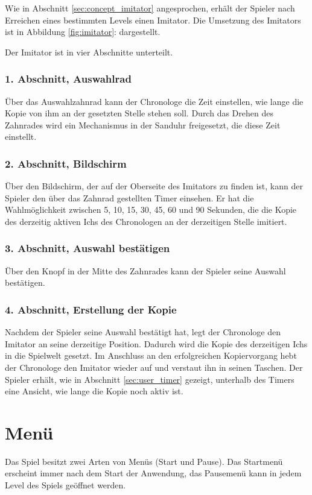 Wie in Abschnitt \ref{sec:concept_imitator}  angesprochen, erhält der Spieler nach Erreichen eines bestimmten Levels einen Imitator. Die Umsetzung des Imitators ist in Abbildung \ref{fig:imitator}:  dargestellt.

Der Imitator ist in vier Abschnitte unterteilt.

\subsubsection{1. Abschnitt, Auswahlrad}
Über das Auswahlzahnrad kann der Chronologe die Zeit einstellen, wie lange die Kopie von ihm an der gesetzten Stelle stehen soll. Durch das Drehen des Zahnrades wird ein Mechanismus in der Sanduhr freigesetzt, die diese Zeit einstellt.

\subsubsection{2. Abschnitt, Bildschirm}
Über den Bildschirm, der auf der Oberseite des Imitators zu finden ist, kann der Spieler den über das Zahnrad gestellten Timer einsehen. Er hat die Wahlmöglichkeit zwischen 5, 10, 15, 30, 45, 60 und 90 Sekunden, die die Kopie des derzeitig aktiven Ichs des Chronologen an der derzeitigen Stelle imitiert. 

\subsubsection{3. Abschnitt, Auswahl bestätigen}
Über den Knopf in der Mitte des Zahnrades kann der Spieler seine Auswahl bestätigen.

\subsubsection{4. Abschnitt, Erstellung der Kopie}
Nachdem der Spieler seine Auswahl bestätigt hat, legt der Chronologe den Imitator an seine derzeitige Position. Dadurch wird die Kopie des derzeitigen Ichs in die Spielwelt gesetzt. Im Anschluss an den erfolgreichen Kopiervorgang hebt der Chronologe den Imitator wieder auf und verstaut ihn in seinen Taschen. Der Spieler erhält, wie in Abschnitt \ref{sec:user_timer}  gezeigt, unterhalb des Timers eine Ansicht, wie lange die Kopie noch aktiv ist.

\section{Menü}
Das Spiel besitzt zwei Arten von Menüs (Start und Pause). Das Startmenü erscheint immer nach dem Start der Anwendung, das Pausemenü kann in jedem Level des Spiels geöffnet werden. 

